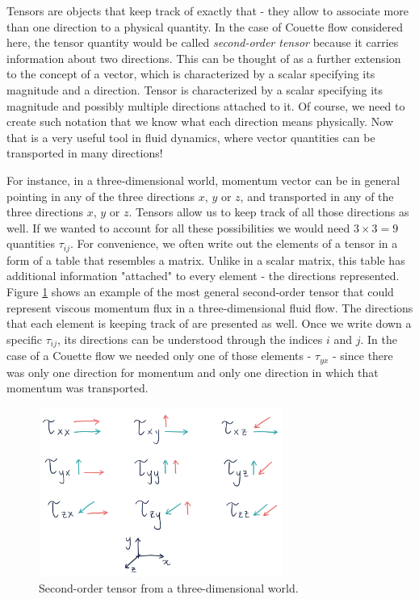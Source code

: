 \documentclass[10pt,twocolumn]{article}
\begin{document}
Tensors are objects that keep track of exactly that - they allow to associate more than one direction to a physical quantity. In the case of Couette flow considered here, the tensor quantity would be called \textit{second-order tensor} because it carries information about two directions. This can be thought of as a further extension to the concept of a vector, which is characterized by a scalar specifying its magnitude and a direction. Tensor is characterized by a scalar specifying its magnitude and possibly multiple directions attached to it. Of course, we need to create such notation that we know what each direction means physically. Now that is a very useful tool in fluid dynamics, where vector quantities can be transported in many directions!

For instance, in a three-dimensional world, momentum vector can be in general pointing in any of the three directions $x$, $y$ or $z$, and transported in any of the three directions $x$, $y$ or $z$. Tensors allow us to keep track of all those directions as well. If we wanted to account for all these possibilities we would need $3 \times 3 = 9$ quantities $\tau_{ij}$. For convenience, we often write out the elements of a tensor in a form of a table that resembles a matrix. Unlike in a scalar matrix, this table has additional information "attached" to every element - the directions represented. Figure \ref{fig:tensor-in-matrix-form} shows an example of the most general second-order tensor that could represent viscous momentum flux in a three-dimensional fluid flow. The directions that each element is keeping track of are presented as well. Once we write down a specific $\tau_{ij}$, its directions can be understood through the indices $i$ and $j$. In the case of a Couette flow we needed only one of those elements - $\tau_{yx}$ - since there was only one direction for momentum and only one direction in which that momentum was transported.


\begin{figure}[H]
\centering\includegraphics[width=8cm]{tensor-in-matrix-form.png}
\caption{Second-order tensor from a three-dimensional world.}
\label{fig:tensor-in-matrix-form}
\end{figure}
\end{document}

